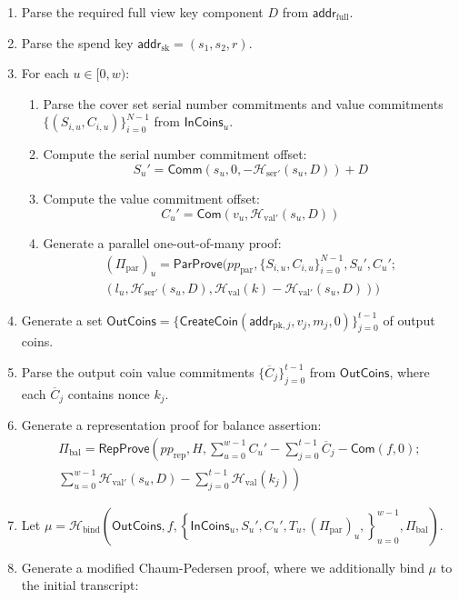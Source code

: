 \documentclass{llncs}
\newcommand{\hash}{\mathcal{H}}
\newcommand{\func}[1]{\mathsf{#1}}
\newcommand{\addr}{\func{addr}}
\newcommand{\com}{\func{Com}}
\newcommand{\comm}{\func{Comm}}
\begin{document}
\begin{enumerate}
    \item Parse the required full view key component $D$ from $\addr_{\text{full}}$.
    \item Parse the spend key $\addr_{\text{sk}} = (s_1, s_2, r)$.
    \item For each $u \in [0,w)$:
    \begin{enumerate}
        \item Parse the cover set serial number commitments and value commitments $\{(S_{i,u}, C_{i,u})\}_{i=0}^{N-1}$ from $\func{InCoins}_u$.
        \item Compute the serial number commitment offset: $$S_u' = \comm(s_u, 0, -\hash_{\text{ser}'}(s_u, D)) + D$$
        \item Compute the value commitment offset: $$C_u' = \com(v_u, \hash_{\text{val}'}(s_u, D))$$
        \item Generate a parallel one-out-of-many proof:
        \begin{multline*}
        (\Pi_{\text{par}})_u = \func{ParProve}(pp_{\text{par}},\{S_{i,u}, C_{i,u}\}_{i=0}^{N-1}, S_u',C_u'; \\
        (l_u, \hash_{\text{ser}'}(s_u, D), \hash_{\text{val}}(k) - \hash_{\text{val}'}(s_u, D)))
        \end{multline*}
    \end{enumerate}
    \item Generate a set $\func{OutCoins} = \{\func{CreateCoin}(\addr_{\text{pk},j}, v_j, m_j, 0)\}_{j=0}^{t-1}$ of output coins.
    \item Parse the output coin value commitments $\{\overline{C}_j\}_{j=0}^{t-1}$ from $\func{OutCoins}$, where each $\overline{C}_j$ contains nonce $k_j$.
    \item Generate a representation proof for balance assertion:
    \begin{multline*}
    \Pi_{\text{bal}} = \func{RepProve}\left( pp_{\text{rep}}, H, \sum_{u=0}^{w-1} C_u' - \sum_{j=0}^{t-1} \overline{C}_j - \com(f,0); \right. \\
    \left. \sum_{u=0}^{w-1} \hash_{\text{val}'}(s_u,D) - \sum_{j=0}^{t-1} \hash_{\text{val}}(k_j) \right)
    \end{multline*}
    \item Let $\mu = \hash_{\text{bind}}( \func{OutCoins}, f, \left\{ \func{InCoins}_u, S_u', C_u', T_u, (\Pi_{\text{par}})_u, \right\}_{u=0}^{w-1}, \Pi_{\text{bal}} )$.
    \item Generate a modified Chaum-Pedersen proof, where we additionally bind $\mu$ to the initial transcript:

\end{enumerate}
\end{document}

